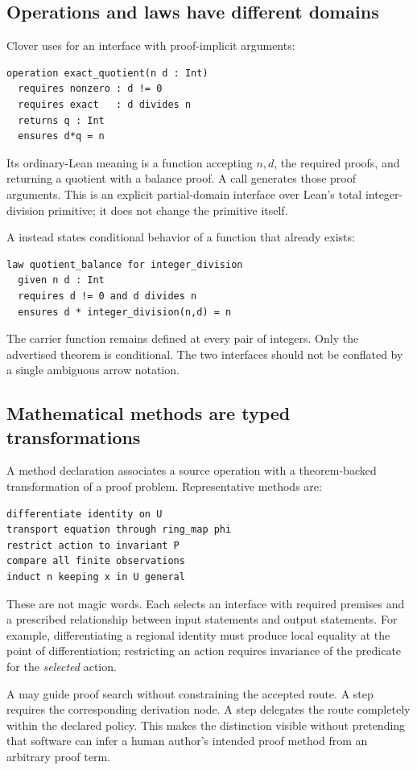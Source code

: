 \documentclass[11pt,a4paper]{article}
\newcommand{\code}[1]{\texttt{\detokenize{#1}}}
\theoremstyle{definition}
\theoremstyle{remark}
\begin{document}
\subsection{Operations and laws have different domains}

Clover uses \code{operation} for an interface with proof-implicit arguments:
\begin{lstlisting}
operation exact_quotient(n d : Int)
  requires nonzero : d != 0
  requires exact   : d divides n
  returns q : Int
  ensures d*q = n
\end{lstlisting}
Its ordinary-Lean meaning is a function accepting $n,d$, the required proofs,
and returning a quotient with a balance proof. A call generates those proof
arguments. This is an explicit partial-domain interface over Lean's total
integer-division primitive; it does not change the primitive itself.

A \code{law} instead states conditional behavior of a function that already
exists:
\begin{lstlisting}
law quotient_balance for integer_division
  given n d : Int
  requires d != 0 and d divides n
  ensures d * integer_division(n,d) = n
\end{lstlisting}
The carrier function remains defined at every pair of integers. Only the
advertised theorem is conditional. The two interfaces should not be conflated
by a single ambiguous arrow notation.

\subsection{Mathematical methods are typed transformations}

A method declaration associates a source operation with a theorem-backed
transformation of a proof problem. Representative methods are:
\begin{lstlisting}
differentiate identity on U
transport equation through ring_map phi
restrict action to invariant P
compare all finite observations
induct n keeping x in U general
\end{lstlisting}
These are not magic words. Each selects an interface with required premises and
a prescribed relationship between input statements and output statements. For
example, differentiating a regional identity must produce local equality at the
point of differentiation; restricting an action requires invariance of the
predicate for the \emph{selected} action.

A \code{hint} may guide proof search without constraining the accepted route.
A \code{by method} step requires the corresponding derivation node. A
\code{search} step delegates the route completely within the declared policy.
This makes the distinction visible without pretending that software can infer
a human author's intended proof method from an arbitrary proof term.
\end{document}
